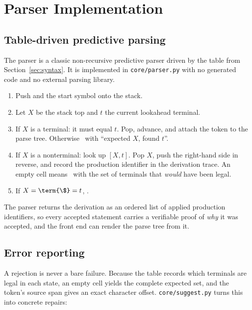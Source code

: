 \section{Parser Implementation}\label{sec:implementation}

\subsection{Table-driven predictive parsing}

The parser is a classic non-recursive predictive parser driven by the table from
Section~\ref{sec:syntax}. It is implemented in \texttt{core/parser.py} with no generated
code and no external parsing library.

\begin{enumerate}[leftmargin=1.4em, itemsep=0.2em]
  \item Push \term{\$} and the start symbol  onto the stack.
  \item Let $X$ be the stack top and $t$ the current lookahead terminal.
  \item If $X$ is a terminal: it must equal $t$. Pop, advance, and attach the token to the
        parse tree. Otherwise \rejected\ with ``expected $X$, found $t$''.
  \item If $X$ is a nonterminal: look up $[X, t]$. Pop $X$, push the right-hand side in
        reverse, and record the production identifier in the derivation trace. An empty
        cell means \rejected\ with the set of terminals that \emph{would} have been legal.
  \item If $X = \term{\$} = t$, \accepted.
\end{enumerate}

The parser returns the derivation as an ordered list of applied production identifiers, so
every accepted statement carries a verifiable proof of \emph{why} it was accepted, and the
front end can render the parse tree from it.


\subsection{Error reporting}

A rejection is never a bare failure. Because the table records which terminals are legal
in each state, an empty cell yields the complete expected set, and the token's source span
gives an exact character offset. \texttt{core/suggest.py} turns this into concrete repairs:

